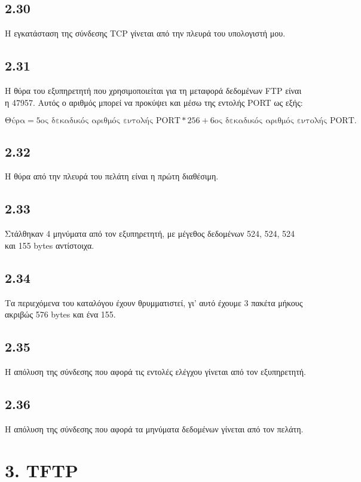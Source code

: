 		\subsection*{2.30}
			Η εγκατάσταση της σύνδεσης TCP γίνεται από την πλευρά του υπολογιστή μου.
		
		\subsection*{2.31}
			Η θύρα του εξυπηρετητή που χρησιμοποιείται για τη μεταφορά δεδομένων FTP είναι η 47957. Αυτός ο αριθμός μπορεί να προκύψει και μέσω της εντολής PORT ως εξής:
			
			\[
			\text{Θύρα} = \text{5ος δεκαδικός αριθμός εντολής PORT} * 256 + \text{6ος δεκαδικός αριθμός εντολής PORT}.
			\]
		
		\subsection*{2.32}
			Η θύρα από την πλευρά του πελάτη είναι η πρώτη διαθέσιμη.
		
		\subsection*{2.33}
			Στάλθηκαν 4 μηνύματα από τον εξυπηρετητή, με μέγεθος δεδομένων 524, 524, 524 και 155 bytes αντίστοιχα.
		
		\subsection*{2.34}
			Τα περιεχόμενα του καταλόγου έχουν θρυμματιστεί, γι' αυτό έχουμε 3 πακέτα μήκους ακριβώς 576 bytes και ένα 155. 
		
		\subsection*{2.35}
			Η απόλυση της σύνδεσης που αφορά τις εντολές ελέγχου γίνεται από τον εξυπηρετητή.
		
		\subsection*{2.36}
			Η απόλυση της σύνδεσης που αφορά τα μηνύματα δεδομένων γίνεται από τον πελάτη.
		
	\section*{3. TFTP}
		
